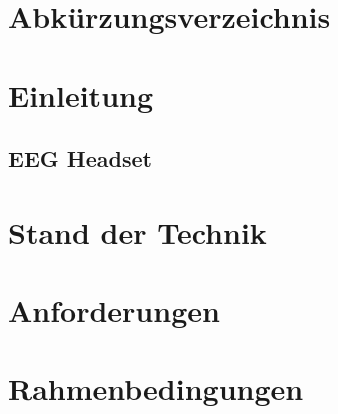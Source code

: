 
\graphicspath{{img/}{./}}


\pagestyle{empty}





\cleardoublepage 
\begingroup
\let\clearpage\relax

\chapter*{Abkürzungsverzeichnis}

%
\endgroup


\pagestyle{WissDokuNorm}

\cleardoublepage


\cleardoublepage
\chapter{Einleitung}


\section{EEG Headset}


\chapter{Stand der Technik}


\chapter{Anforderungen}


\chapter{Rahmenbedingungen}


